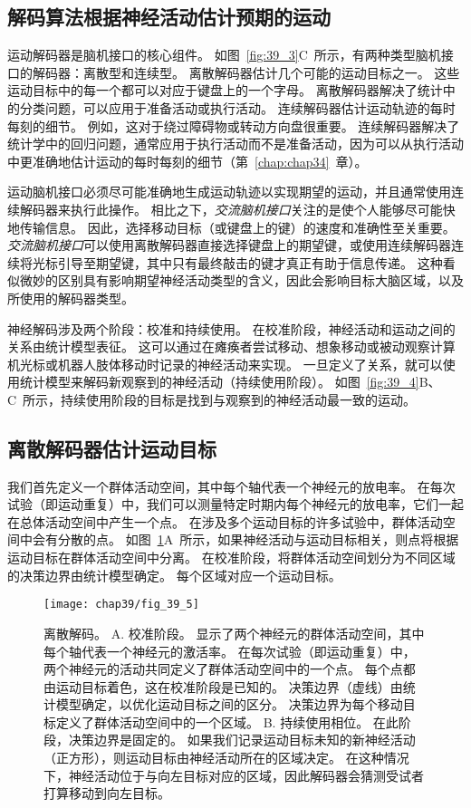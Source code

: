 \subsection{解码算法根据神经活动估计预期的运动}

运动解码器是脑机接口的核心组件。 
如图~\ref{fig:39_3}C~所示，有两种类型脑机接口的解码器：离散型和连续型。
离散解码器估计几个可能的运动目标之一。
这些运动目标中的每一个都可以对应于键盘上的一个字母。
离散解码器解决了统计中的分类问题，可以应用于准备活动或执行活动。
连续解码器估计运动轨迹的每时每刻的细节。
例如，这对于绕过障碍物或转动方向盘很重要。
连续解码器解决了统计学中的回归问题，通常应用于执行活动而不是准备活动，因为可以从执行活动中更准确地估计运动的每时每刻的细节（第~\ref{chap:chap34}~章）。


运动脑机接口必须尽可能准确地生成运动轨迹以实现期望的运动，并且通常使用连续解码器来执行此操作。
相比之下，\textit{交流脑机接口}关注的是使个人能够尽可能快地传输信息。
因此，选择移动目标（或键盘上的键）的速度和准确性至关重要。
\textit{交流脑机接口}可以使用离散解码器直接选择键盘上的期望键，或使用连续解码器连续将光标引导至期望键，其中只有最终敲击的键才真正有助于信息传递。
这种看似微妙的区别具有影响期望神经活动类型的含义，因此会影响目标大脑区域，以及所使用的解码器类型。


神经解码涉及两个阶段：校准和持续使用。
在校准阶段，神经活动和运动之间的关系由统计模型表征。
这可以通过在瘫痪者尝试移动、想象移动或被动观察计算机光标或机器人肢体移动时记录的神经活动来实现。
一旦定义了关系，就可以使用统计模型来解码新观察到的神经活动（持续使用阶段）。
如图~\ref{fig:39_4}B、C~所示，持续使用阶段的目标是找到与观察到的神经活动最一致的运动。



\subsection{离散解码器估计运动目标}

我们首先定义一个群体活动空间，其中每个轴代表一个神经元的放电率。
在每次试验（即运动重复）中，我们可以测量特定时期内每个神经元的放电率，它们一起在总体活动空间中产生一个点。
在涉及多个运动目标的许多试验中，群体活动空间中会有分散的点。
如图~\ref{fig:39_5}A~所示，如果神经活动与运动目标相关，则点将根据运动目标在群体活动空间中分离。
在校准阶段，将群体活动空间划分为不同区域的决策边界由统计模型确定。
每个区域对应一个运动目标。


\begin{figure}[htbp]
	\centering
	\texttt{[image: chap39/fig\_39\_5]}
	\caption{离散解码。
		A. 校准阶段。
		显示了两个神经元的群体活动空间，其中每个轴代表一个神经元的激活率。
		在每次试验（即运动重复）中，两个神经元的活动共同定义了群体活动空间中的一个点。
		每个点都由运动目标着色，这在校准阶段是已知的。 
		决策边界（虚线）由统计模型确定，以优化运动目标之间的区分。
		决策边界为每个移动目标定义了群体活动空间中的一个区域。
		B. 持续使用相位。
		在此阶段，决策边界是固定的。
		如果我们记录运动目标未知的新神经活动（正方形），则运动目标由神经活动所在的区域决定。
		在这种情况下，神经活动位于与向左目标对应的区域，因此解码器会猜测受试者打算移动到向左目标。}
	\label{fig:39_5}
\end{figure}



